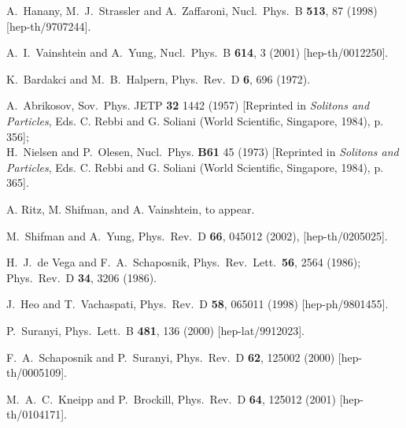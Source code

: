 \documentclass[12pt,epsf]{article}
\begin{document}
\begin{thebibliography}{99}
A.~Hanany, M.~J.~Strassler and A.~Zaffaroni,
Nucl.\ Phys.\ B {\bf 513}, 87 (1998)
[hep-th/9707244].

A.~I.~Vainshtein and A.~Yung,
Nucl.\ Phys.\ B {\bf 614}, 3 (2001)
[hep-th/0012250].

K.~Bardakci and M.~B.~Halpern,
Phys.\ Rev.\ D {\bf 6}, 696 (1972).



A.~Abrikosov, Sov.~Phys. JETP {\bf32} 1442  (1957)
[Reprinted in {\em Solitons and Particles}, Eds. C. Rebbi and G. Soliani
(World Scientific, Singapore, 1984), p. 356];\\
H.~Nielsen and P.~Olesen, Nucl.~Phys. {\bf B61} 45 (1973)
[Reprinted in {\em Solitons and Particles}, Eds. C. Rebbi and G. Soliani
(World Scientific, Singapore, 1984), p. 365].

A. Ritz, M. Shifman, and A. Vainshtein, to appear.

M.~Shifman and A.~Yung,
Phys.\ Rev.\ D {\bf 66}, 045012 (2002), [hep-th/0205025].

H.~J.~de Vega and F.~A.~Schaposnik,
Phys.\ Rev.\ Lett.\  {\bf 56}, 2564 (1986);
Phys.\ Rev.\ D {\bf 34}, 3206 (1986).

J.~Heo and T.~Vachaspati,
Phys.\ Rev.\ D {\bf 58}, 065011 (1998)
[hep-ph/9801455].

P.~Suranyi,
Phys.\ Lett.\ B {\bf 481}, 136 (2000)
[hep-lat/9912023].

F.~A.~Schaposnik and P.~Suranyi,
Phys.\ Rev.\ D {\bf 62}, 125002 (2000)
[hep-th/0005109].

M.~A.~C.~Kneipp and P.~Brockill,
Phys.\ Rev.\ D {\bf 64}, 125012 (2001)
[hep-th/0104171].


\end{thebibliography}
\end{document}
